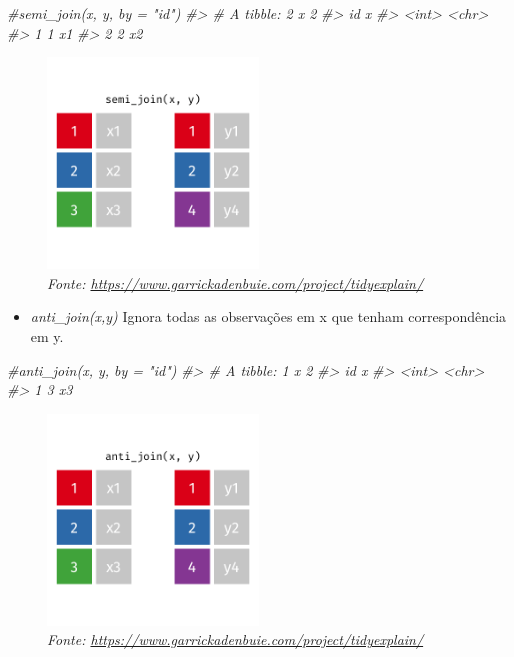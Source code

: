 \documentclass[
]{article}
\newenvironment{Shaded}{\begin{snugshade}}{\end{snugshade}}
\newcommand{\CommentTok}[1]{\textcolor[rgb]{0.56,0.35,0.01}{\textit{#1}}}
\providecommand{\tightlist}{%
  \setlength{\itemsep}{0pt}\setlength{\parskip}{0pt}}
\begin{document}
\begin{Shaded}
\begin{Highlighting}[]
\CommentTok{#semi_join(x, y, by = "id")}
\CommentTok{#> # A tibble: 2 x 2}
\CommentTok{#>      id x    }
\CommentTok{#>   <int> <chr>}
\CommentTok{#> 1     1 x1   }
\CommentTok{#> 2     2 x2}
\end{Highlighting}
\end{Shaded}

\begin{figure}
\centering
\includegraphics[width=0.5\textwidth,height=\textheight]{semi-join.gif}
\caption{\emph{Fonte:
\url{https://www.garrickadenbuie.com/project/tidyexplain/}}}
\end{figure}

\begin{itemize}
\tightlist
\item
  \emph{anti\_join(x,y)} Ignora todas as observações em x que tenham
  correspondência em y.
\end{itemize}

\begin{Shaded}
\begin{Highlighting}[]
\CommentTok{#anti_join(x, y, by = "id")}
\CommentTok{#> # A tibble: 1 x 2}
\CommentTok{#>      id x    }
\CommentTok{#>   <int> <chr>}
\CommentTok{#> 1     3 x3}
\end{Highlighting}
\end{Shaded}

\begin{figure}
\centering
\includegraphics[width=0.5\textwidth,height=\textheight]{anti-join.gif}
\caption{\emph{Fonte:
\url{https://www.garrickadenbuie.com/project/tidyexplain/}}}
\end{figure}
\end{document}
